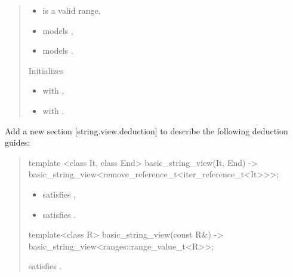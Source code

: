 \documentclass{wg21}
\begin{document}
\begin{quote}
\begin{addedblock}
\begin{itemdescr}
    \expects
    \begin{itemize}
	    \item {} is a valid range,
	    \item {} models ,
    	\item {} models .
	\end{itemize}

    \effects
    Initializes
    
    \begin{itemize}
    	\item {} with ,
    	\item {} with .
    \end{itemize}

\end{itemdescr}
\end{addedblock}
\end{quote}


Add a new section [string.view.deduction] to describe the following deduction guides:



\begin{quote}
\begin{addedblock}
\begin{itemdecl}
template <class It, class End>
basic_string_view(It, End) -> basic_string_view<remove_reference_t<iter_reference_t<It>>>;
\end{itemdecl}
\begin{itemdescr}
    \constraints
    \begin{itemize}
        \item {} satisfies ,
        \item {} satisfies .
    \end{itemize}
\end{itemdescr}

\begin{itemdecl}
template<class R>
basic_string_view(const R&)
-> basic_string_view<ranges::range_value_t<R>>;
\end{itemdecl}
\begin{itemdescr}
    \constraints {} satisfies .
\end{itemdescr}

\end{addedblock}
\end{quote}
\end{document}
